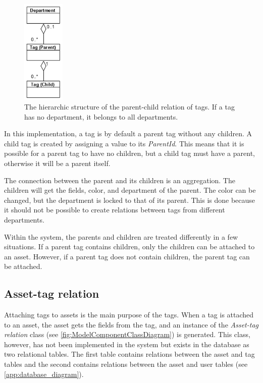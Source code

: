 \begin{figure}[H]
    \centering
    \includegraphics[width=0.18\textwidth]{figures/Implementation/TagHierarchicStructure.png}
    \caption{The hierarchic structure of the parent-child relation of tags. If a tag has no department, it belongs to all departments.}
    \label{fig:TagHierarchicStructureWithDepartment}
\end{figure}

In this implementation, a tag is by default a parent tag without any children. A child tag is created by assigning a value to its \textit{ParentId}. This means that it is possible for a parent tag to have no children, but a child tag must have a parent, otherwise it will be a parent itself.
\par
The connection between the parent and its children is an aggregation. The children will get the fields, color, and department of the parent. The color can be changed, but the department is locked to that of its parent. This is done because it should not be possible to create relations between tags from different departments.
\par
Within the system, the parents and children are treated differently in a few situations. If a parent tag contains children, only the children can be attached to an asset. However, if a parent tag does not contain children, the parent tag can be attached.

\subsection{Asset-tag relation}
Attaching tags to assets is the main purpose of the tags. When a tag is attached to an asset, the asset gets the fields from the tag, and an instance of the \textit{Asset-tag relation} class (see \autoref{fig:ModelComponentClassDiagram}) is generated. This class, however, has not been implemented in the system but exists in the database as two relational tables. The first table contains relations between the asset and tag tables and the second contains relations between the asset and user tables (see \autoref{app:database_diagram}). 
\par


